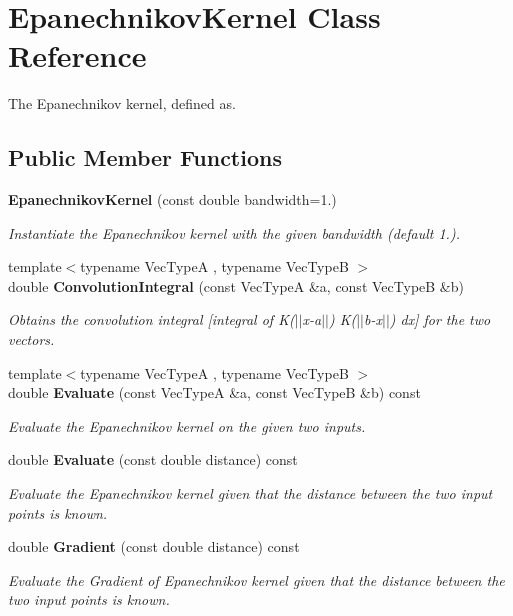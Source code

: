 \section{Epanechnikov\+Kernel Class Reference}
\label{classmlpack_1_1kernel_1_1EpanechnikovKernel}


The Epanechnikov kernel, defined as.  


\subsection*{Public Member Functions}
\begin{DoxyCompactItemize}
\item 
\textbf{ Epanechnikov\+Kernel} (const double bandwidth=1.)
\begin{DoxyCompactList}\small\item\em Instantiate the Epanechnikov kernel with the given bandwidth (default 1.). \end{DoxyCompactList}\item 
{\footnotesize template$<$typename Vec\+TypeA , typename Vec\+TypeB $>$ }\\double \textbf{ Convolution\+Integral} (const Vec\+TypeA \&a, const Vec\+TypeB \&b)
\begin{DoxyCompactList}\small\item\em Obtains the convolution integral [integral of K($\vert$$\vert$x-\/a$\vert$$\vert$) K($\vert$$\vert$b-\/x$\vert$$\vert$) dx] for the two vectors. \end{DoxyCompactList}\item 
{\footnotesize template$<$typename Vec\+TypeA , typename Vec\+TypeB $>$ }\\double \textbf{ Evaluate} (const Vec\+TypeA \&a, const Vec\+TypeB \&b) const
\begin{DoxyCompactList}\small\item\em Evaluate the Epanechnikov kernel on the given two inputs. \end{DoxyCompactList}\item 
double \textbf{ Evaluate} (const double distance) const
\begin{DoxyCompactList}\small\item\em Evaluate the Epanechnikov kernel given that the distance between the two input points is known. \end{DoxyCompactList}\item 
double \textbf{ Gradient} (const double distance) const
\begin{DoxyCompactList}\small\item\em Evaluate the Gradient of Epanechnikov kernel given that the distance between the two input points is known. \end{DoxyCompactList}\item 

\end{DoxyCompactItemize}
